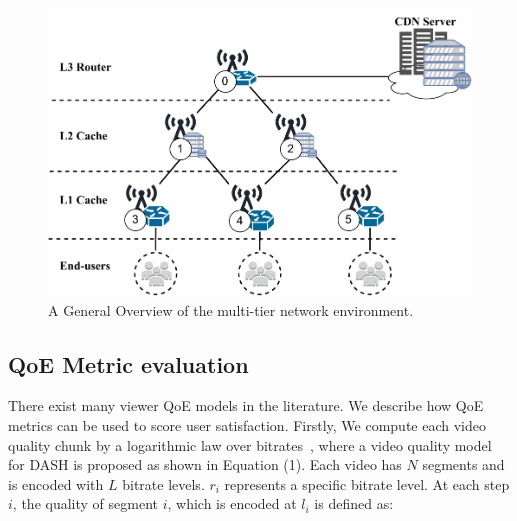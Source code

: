 \begin{figure}
    \centering
    \includegraphics[width=\linewidth]{images/qoe-multi-level-2.pdf}
    \caption{A General Overview of the multi-tier network environment.}
    \label{fig:exp-setup-scenario}
\end{figure}



\subsection{QoE Metric evaluation}
There exist many viewer QoE models in the literature. We describe how QoE metrics can be used to score user satisfaction. Firstly, We compute each video quality chunk by a logarithmic law over bitrates~\cite{Reichl:TSys2013}, where a video quality model for DASH is proposed as shown in Equation (1). Each video has $N$ segments and is encoded with $L$ bitrate levels. $r_i$ represents a specific bitrate level. At each step $i$, the quality of segment $i$, which is encoded at $l_i$ is defined as:

